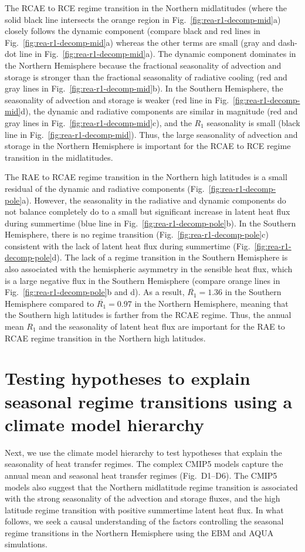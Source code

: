 \documentclass{ametsocV5}
\begin{document}
    The RCAE to RCE regime transition in the Northern midlatitudes (where the solid black line intersects the orange region in Fig.~\ref{fig:rea-r1-decomp-mid}a) closely follows the dynamic component (compare black and red lines in Fig.~\ref{fig:rea-r1-decomp-mid}a) whereas the other terms are small (gray and dash-dot line in Fig.~\ref{fig:rea-r1-decomp-mid}a). The dynamic component dominates in the Northern Hemisphere because the fractional seasonality of advection and storage is stronger than the fractional seasonality of radiative cooling (red and gray lines in Fig.~\ref{fig:rea-r1-decomp-mid}b). In the Southern Hemisphere, the seasonality of advection and storage is weaker (red line in Fig.~\ref{fig:rea-r1-decomp-mid}d), the dynamic and radiative components are similar in magnitude (red and gray lines in Fig.~\ref{fig:rea-r1-decomp-mid}c), and the $R_1$ seasonality is small (black line in Fig.~\ref{fig:rea-r1-decomp-mid}). Thus, the large seasonality of advection and storage in the Northern Hemisphere is important for the RCAE to RCE regime transition in the midlatitudes.

    The RAE to RCAE regime transition in the Northern high latitudes is a small residual of the dynamic and radiative components (Fig.~\ref{fig:rea-r1-decomp-pole}a). However, the seasonality in the radiative and dynamic components do not balance completely do to a small but significant increase in latent heat flux during summertime (blue line in Fig.~\ref{fig:rea-r1-decomp-pole}b). In the Southern Hemisphere, there is no regime transition (Fig.~\ref{fig:rea-r1-decomp-pole}c) consistent with the lack of latent heat flux during summertime (Fig.~\ref{fig:rea-r1-decomp-pole}d). The lack of a regime transition in the Southern Hemisphere is also associated with the hemispheric asymmetry in the sensible heat flux, which is a large negative flux in the Southern Hemisphere (compare orange lines in Fig.~\ref{fig:rea-r1-decomp-pole}b and d). As a result, $\overline{R_1}=1.36$ in the Southern Hemisphere compared to $\overline{R_1}=0.97$ in the Northern Hemisphere, meaning that the Southern high latitudes is farther from the RCAE regime. Thus, the annual mean $R_1$ and the seasonality of latent heat flux are important for the RAE to RCAE regime transition in the Northern high latitudes.

\section{Testing hypotheses to explain seasonal regime transitions using a climate model hierarchy} \label{sec:hypo}
  Next, we use the climate model hierarchy to test hypotheses that explain the seasonality of heat transfer regimes. The complex CMIP5 models capture the annual mean and seasonal heat transfer regimes (Fig.~D1--D6). The CMIP5 models also suggest that the Northern midlatitude regime transition is associated with the strong seasonality of the advection and storage fluxes, and the high latitude regime transition with positive summertime latent heat flux. In what follows, we seek a causal understanding of the factors controlling the seasonal regime transitions in the Northern Hemisphere using the EBM and AQUA simulations.
\end{document}
